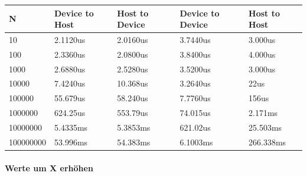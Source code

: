 \documentclass{article}
\begin{document}
\begin{center}
	\begin{tabular}{|l|l|l|l|l|}
		\hline
		N         & Device to Host     & Host to Device     & Device to Device     & Host to Host      \\ \hline \hline
		10			& 2.1120us & 2.0160us &  3.7440us & 3.000us \\ \hline
		100			& 2.3360us & 2.0800us  & 3.8400us & 4.000us\\ \hline
		1000	& 2.6880us & 2.5280us & 3.5200us & 3.000us \\ \hline 
		10000     & 7.4240us & 10.368us & 3.2640us & 22us      \\ \hline
		100000    & 55.679us & 58.240us & 7.7760us & 156us     \\ \hline
		1000000   & 624.25us & 553.79us & 74.015us & 2.171ms   \\ \hline
		10000000  & 5.4335ms & 5.3853ms & 621.02us & 25.503ms  \\ \hline
		100000000 & 53.996ms & 54.383ms & 6.1003ms & 266.338ms \\ \hline
	\end{tabular}
\end{center}

\paragraph{Werte um X erhöhen} 
\end{document}
